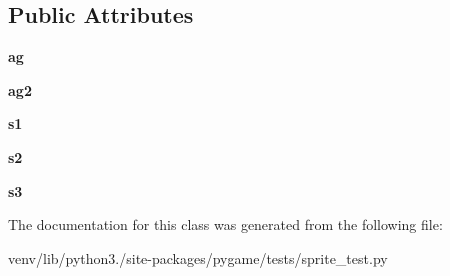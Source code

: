 \subsection*{Public Attributes}
\begin{DoxyCompactItemize}
\item 
\mbox{\label{classpygame_1_1tests_1_1sprite__test_1_1_sprite_collide_test_abbfcb87bad7caaa3fb89125784d925ed}} 
{\bfseries ag}
\item 
\mbox{\label{classpygame_1_1tests_1_1sprite__test_1_1_sprite_collide_test_a892b62bac37da151eebdce488f6f5568}} 
{\bfseries ag2}
\item 
\mbox{\label{classpygame_1_1tests_1_1sprite__test_1_1_sprite_collide_test_acd113044c053f0c966b7a6ad30c5993b}} 
{\bfseries s1}
\item 
\mbox{\label{classpygame_1_1tests_1_1sprite__test_1_1_sprite_collide_test_a80f6f8156b95f9ba04bd2f9a166841fa}} 
{\bfseries s2}
\item 
\mbox{\label{classpygame_1_1tests_1_1sprite__test_1_1_sprite_collide_test_aef0cf671b90a0dd991a22c305562cb63}} 
{\bfseries s3}
\end{DoxyCompactItemize}


The documentation for this class was generated from the following file\+:\begin{DoxyCompactItemize}
\item 
venv/lib/python3./site-\/packages/pygame/tests/sprite\+\_\+test.\+py\end{DoxyCompactItemize}
